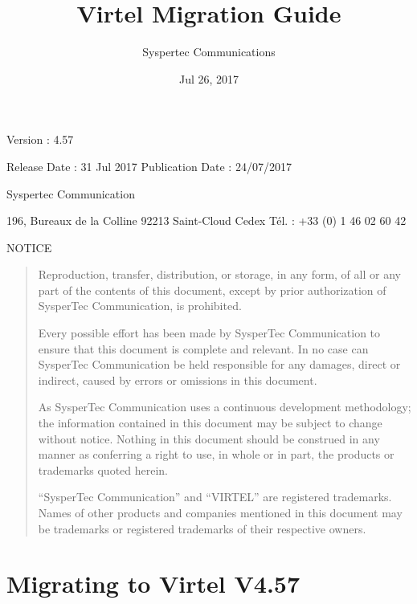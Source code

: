 \documentclass[letterpaper,10pt,english]{sphinxmanual}
\title{Virtel Migration Guide}
\date{Jul 26, 2017}
\author{Syspertec Communications}
\begin{document}
\maketitle
\sphinxtableofcontents
{}\label{\detokenize{Migration_Guide::doc}}



Version : 4.57

Release Date : 31 Jul 2017 Publication Date : 24/07/2017

Syspertec Communication

196, Bureaux de la Colline 92213 Saint-Cloud Cedex Tél. : +33 (0) 1 46 02 60 42


NOTICE
\begin{quote}

Reproduction, transfer, distribution, or storage, in any form, of all or any part of
the contents of this document, except by prior authorization of SysperTec
Communication, is prohibited.

Every possible effort has been made by SysperTec Communication to ensure that this document
is complete and relevant. In no case can SysperTec Communication be held responsible for
any damages, direct or indirect, caused by errors or omissions in this document.

As SysperTec Communication uses a continuous development methodology; the information
contained in this document may be subject to change without notice. Nothing in this
document should be construed in any manner as conferring a right to use, in whole or in
part, the products or trademarks quoted herein.

“SysperTec Communication” and “VIRTEL” are registered trademarks. Names of other products
and companies mentioned in this document may be trademarks or registered trademarks of
their respective owners.
\end{quote}

\newpage


\chapter{Migrating to Virtel V4.57}
\label{\detokenize{Migration_Guide:v457mi-introduction}}\label{\detokenize{Migration_Guide:index-0}}\label{\detokenize{Migration_Guide:migrating-to-virtel-v4-57}}\label{\detokenize{Migration_Guide:migration-guide-v4-57}}\label{\detokenize{Migration_Guide:virtel457mi}}
\end{document}
